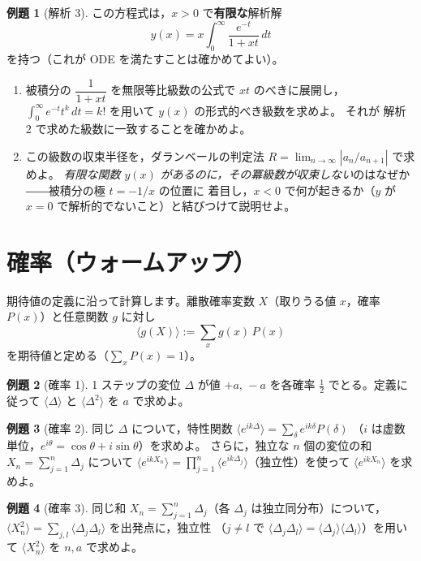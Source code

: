 \documentclass[dvipdfmx, uplatex]{jsarticle}
\theoremstyle{definition}
\newtheorem*{ex}{例題}
\begin{document}
\begin{ex}[解析 3]
この方程式は，$x>0$ で\textbf{有限な}解析解
\[
    y(x)=x\int_0^\infty\frac{e^{-t}}{1+xt}\,dt
\]
を持つ（これが ODE を満たすことは確かめてよい）。
\begin{enumerate}
\item[(a)] 被積分の $\dfrac{1}{1+xt}$ を無限等比級数の公式で $xt$ のべきに展開し，
$\displaystyle\int_0^\infty e^{-t}t^k\,dt=k!$ を用いて $y(x)$ の形式的べき級数を求めよ。
それが 解析 2 で求めた級数に一致することを確かめよ。
\item[(b)] この級数の収束半径を，ダランベールの判定法 $R=\lim_{n\to\infty}|a_n/a_{n+1}|$ で求めよ。
\emph{有限な関数 $y(x)$ があるのに，その冪級数が収束しない}のはなぜか――被積分の極 $t=-1/x$ の位置に
着目し，$x<0$ で何が起きるか（$y$ が $x=0$ で解析的でないこと）と結びつけて説明せよ。
\end{enumerate}
\end{ex}

\section{確率（ウォームアップ）}
期待値の定義に沿って計算します。離散確率変数 $X$（取りうる値 $x$，確率 $P(x)$）と任意関数 $g$ に対し
\[
    \langle g(X)\rangle := \sum_{x} g(x)\,P(x)
\]
を期待値と定める（$\sum_x P(x)=1$）。

\begin{ex}[確率 1]
1 ステップの変位 $\Delta$ が値 $+a,\,-a$ を各確率 $\tfrac12$ でとる。定義に従って
$\langle\Delta\rangle$ と $\langle\Delta^2\rangle$ を $a$ で求めよ。
\end{ex}

\begin{ex}[確率 2]
同じ $\Delta$ について，特性関数 $\langle e^{ik\Delta}\rangle=\sum_\delta e^{ik\delta}P(\delta)$
（$i$ は虚数単位，$e^{i\theta}=\cos\theta+i\sin\theta$）を求めよ。
さらに，独立な $n$ 個の変位の和 $X_n=\sum_{j=1}^n\Delta_j$ について
$\langle e^{ikX_n}\rangle=\prod_{j=1}^n\langle e^{ik\Delta_j}\rangle$（独立性）を使って $\langle e^{ikX_n}\rangle$ を求めよ。
\end{ex}

\begin{ex}[確率 3]
同じ和 $X_n=\sum_{j=1}^n\Delta_j$（各 $\Delta_j$ は独立同分布）について，
$\langle X_n^2\rangle=\sum_{j,l}\langle\Delta_j\Delta_l\rangle$ を出発点に，独立性
（$j\neq l$ で $\langle\Delta_j\Delta_l\rangle=\langle\Delta_j\rangle\langle\Delta_l\rangle$）を用いて
$\langle X_n^2\rangle$ を $n,a$ で求めよ。
\end{ex}
\end{document}
